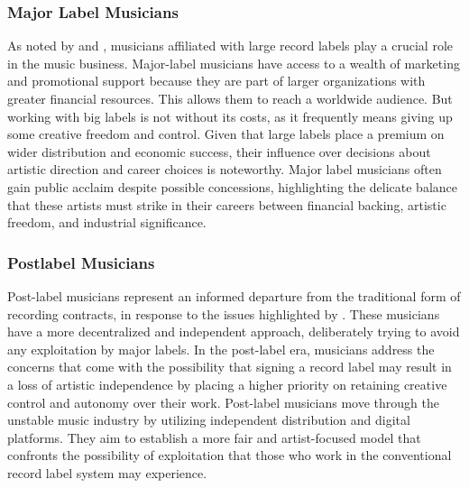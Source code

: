 \subsubsection{Major Label Musicians}
As noted by \textcite{arditi21} and \textcite{martinez21}, musicians affiliated with large record labels play a crucial role in the music business. Major-label musicians have access to a wealth of marketing and promotional support because they are part of larger organizations with greater financial resources. This allows them to reach a worldwide audience. But working with big labels is not without its costs, as it frequently means giving up some creative freedom and control. Given that large labels place a premium on wider distribution and economic success, their influence over decisions about artistic direction and career choices is noteworthy. Major label musicians often gain public acclaim despite possible concessions, highlighting the delicate balance that these artists must strike in their careers between financial backing, artistic freedom, and industrial significance.

\subsubsection{Postlabel Musicians}
Post-label musicians represent an informed departure from the traditional form of recording contracts, in response to the issues highlighted by \textcite{arditi21}. These musicians have a more decentralized and independent approach, deliberately trying to avoid any exploitation by major labels. In the post-label era, musicians address the concerns that come with the possibility that signing a record label may result in a loss of artistic independence by placing a higher priority on retaining creative control and autonomy over their work. Post-label musicians move through the unstable music industry by utilizing independent distribution and digital platforms. They aim to establish a more fair and artist-focused model that confronts the possibility of exploitation that those who work in the conventional record label system may experience.

